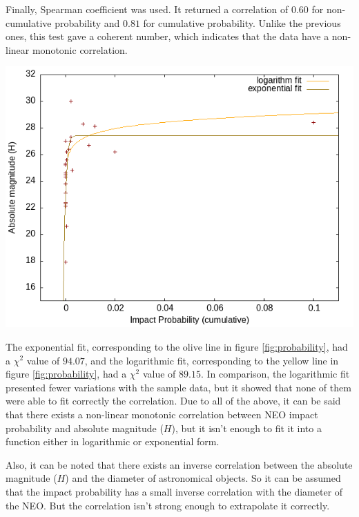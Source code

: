 \documentclass[a1,portrait]{a1poster}
\begin{document}
\begin{multicols}{2}
Finally, Spearman coefficient was used. It returned a correlation of $0.60$ for non-cumulative
probability and $0.81$ for cumulative probability. Unlike the previous ones, this test gave a
coherent number, which indicates that the data have a non-linear monotonic correlation.

\begin{center}\vspace{1cm}
    \includegraphics[width=0.5\linewidth]{correlation}
    \label{fig:probability}
\end{center}\vspace{1cm}

The exponential fit, corresponding to the olive line in figure \ref{fig:probability}, had a $\chi^2$
value of $94.07$, and the logarithmic fit, corresponding to the yellow line in figure \ref{fig:probability},
had a $\chi^2$ value of $89.15$. In comparison, the logarithmic fit presented fewer variations with the
sample data, but it showed that none of them were able to fit correctly the correlation. Due to all of
the above, it can be said that there exists a non-linear monotonic correlation between NEO impact
probability and absolute magnitude ($H$), but it isn't enough to fit it into a function either in
logarithmic or exponential form.

Also, it can be noted that there exists an inverse correlation between the absolute magnitude ($H$) and
the diameter of astronomical objects. So it can be assumed that the impact probability has a small inverse
correlation with the diameter of the NEO. But the correlation isn't strong enough to extrapolate it
correctly.



\end{multicols}
\end{document}
